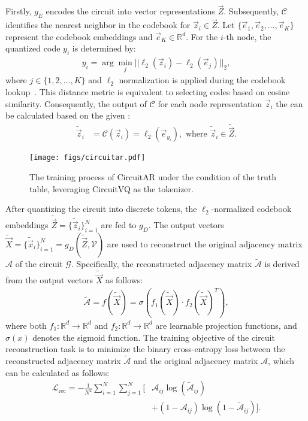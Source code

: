 Firstly, $g_E$ encodes the circuit into vector representations $\vec{Z}$. 
Subsequently, $\mathcal{C}$ identifies the nearest neighbor in the codebook for $\vec{z}_{i} \in \vec{Z}$. 
Let $\{\vec{e}_1, \vec{e}_2, \dots, \vec{e}_{K}\}$ represent the codebook embeddings and $\vec{e}_{K} \in \mathbb{R}^{d}$. 
For the $i$-th node, the quantized code $y_i$ is determined by:
\begin{align}
	y_i = \arg \min_{j} || \ell_2(\vec{z}_i) - \ell_2(\vec{e}_j)||_2,
\label{eq:vq_dis}
\end{align}
where $j \in \{1, 2, \dots, K\}$ and $\ell_2$ normalization is applied during the codebook lookup~\cite{van2017vqvae, yu2021vqgan_i}. 
This distance metric is equivalent to selecting codes based on cosine similarity.
Consequently, the output of $\mathcal{C}$ for each node representation $\vec{z}_i$ the can be calculated based on the given :
\begin{align}
	\tilde{\vec{z}}_i &= \mathcal{C}(\vec{z}_{i}) = \ell_2(\vec{e}_{y_i}), \text{ where } \tilde{\vec{z}}_i \in \tilde{\vec{Z}}.
\label{eq:vq_emb}
\end{align}
\begin{figure}[t]
    \centering
    \texttt{[image: figs/circuitar.pdf]} 
    \caption{The training process of CircuitAR under the condition of the truth table, leveraging CircuitVQ as the tokenizer.}
    \label{fig:circuitar}
\end{figure}
After quantizing the circuit into discrete tokens, the $\ell_2$-normalized codebook embeddings $\tilde{\vec{Z}} = \{\tilde{\vec{z}}_i\}_{i=1}^{N}$ are fed to $g_D$.
The output vectors $\tilde{\vec{X}} = \{\tilde{\vec{x}}_i \}_{i=1}^{N} = g_D(\tilde{\vec{Z}}, \mathcal{V})$ are used to reconstruct the original adjacency matrix $\mathcal{A}$ of the circuit $\mathcal{G}$. 
Specifically, the reconstructed adjacency matrix $\tilde{\mathcal{A}}$ is derived from the output vectors $\tilde{\vec{X}}$ as follows:
\begin{align}
    \tilde{\mathcal{A}} = f(\tilde{\vec{X}}) = \sigma\left(f_1(\tilde{\vec{X}}) \cdot f_2(\tilde{\vec{X}})^T\right),
\end{align}
where both $f_1: \mathbb{R}^{d} \rightarrow \mathbb{R}^{d}$ and $f_2: \mathbb{R}^{d} \rightarrow \mathbb{R}^{d}$ are learnable projection functions, and $\sigma(x)$ denotes the sigmoid function.
The training objective of the circuit reconstruction task is to minimize the binary cross-entropy loss between the reconstructed adjacency matrix $\tilde{\mathcal{A}}$ and the original adjacency matrix $\mathcal{A}$, which can be calculated as follows:
\begin{align}
	\mathcal{L}_\text{rec} = -\frac{1}{N^2} \sum_{i=1}^{N} \sum_{j=1}^{N} \bigl[ 
		& \mathcal{A}_{ij} \log(\tilde{\mathcal{A}}_{ij}) \nonumber \\
		& + (1 - \mathcal{A}_{ij}) \log(1 - \tilde{\mathcal{A}}_{ij}) \bigr].
\end{align}

